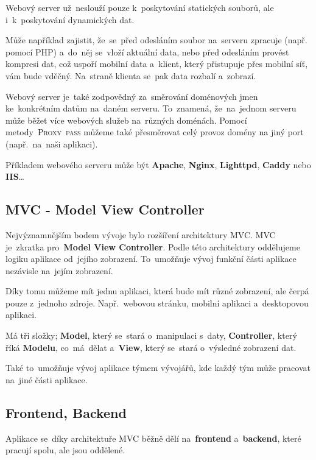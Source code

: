 \documentclass[14pt,a4paper]{article}
\begin{document}
        Webový server už~neslouží pouze k~poskytování statických souborů, ale i~k~poskytování dynamických dat.

        Může například zajistit, že~se~před odesláním soubor na~serveru zpracuje (např. pomocí PHP) a~do~něj se~vloží aktuální data, nebo před odesláním provést kompresi dat, což uspoří mobilní data a~klient, který přistupuje přes mobilní síť, vám bude vděčný. Na~straně klienta se~pak data rozbalí a~zobrazí.

        Webový server je~také zodpovědný za~směrování doménových jmen ke~konkrétním datům na~daném serveru. To~znamená, že~na~jednom serveru může běžet více webových služeb na~různých doménách.
        Pomocí metody~\textsc{Proxy~pass} můžeme také přesměrovat celý provoz domény na jiný port (např.~na~naši aplikaci). \parencite{webserver:mdn}

        Příkladem webového serveru může být \textbf{Apache}, \textbf{Nginx}, \textbf{Lighttpd}, \textbf{Caddy} nebo \textbf{IIS}\dots

        
        \subsection{MVC - Model View Controller}
        Nejvýznamnějším bodem vývoje bylo rozšíření architektury MVC. MVC je~zkratka pro~\textbf{Model View Controller}.
        Podle této architektury oddělujeme logiku aplikace od~jejího zobrazení. To~umožňuje vývoj funkční části aplikace nezávisle na~jejím zobrazení.

        Díky tomu můžeme mít jednu aplikaci, která bude mít různé zobrazení, ale čerpá pouze z~jednoho zdroje. Např.~webovou stránku, mobilní aplikaci a~desktopovou aplikaci.

        Má tři složky; \textbf{Model}, který se~stará o~manipulaci s~daty, \textbf{Controller}, který říká \textbf{Modelu}, co~má~dělat
        a~\textbf{View}, který se~stará o~výsledné zobrazení dat.

        Také to~umožňuje vývoj aplikace týmem vývojářů, kde každý tým může pracovat na~jiné části aplikace. \parencite{mvc}

        \subsection{Frontend, Backend}
        Aplikace se~díky architektuře \textsc{MVC} běžně dělí na~\textbf{frontend} a~\textbf{backend}, které pracují spolu, ale jsou oddělené.
\end{document}
